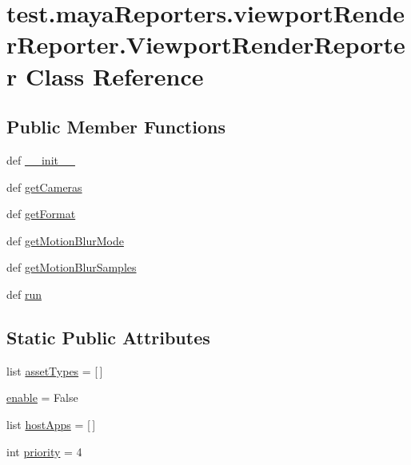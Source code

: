 \hypertarget{classtest_1_1mayaReporters_1_1viewportRenderReporter_1_1ViewportRenderReporter}{\section{test.\-maya\-Reporters.\-viewport\-Render\-Reporter.\-Viewport\-Render\-Reporter \-Class \-Reference}
\label{dd/d73/classtest_1_1mayaReporters_1_1viewportRenderReporter_1_1ViewportRenderReporter}
}
\subsection*{\-Public \-Member \-Functions}
\begin{DoxyCompactItemize}
\item 
def \hyperlink{classtest_1_1mayaReporters_1_1viewportRenderReporter_1_1ViewportRenderReporter_a0e86af8b3c2b1cc188761aa8ea526bb4}{\-\_\-\-\_\-init\-\_\-\-\_\-}
\item 
def \hyperlink{classtest_1_1mayaReporters_1_1viewportRenderReporter_1_1ViewportRenderReporter_a5aedf9a114103ffe4de36abe783adcc7}{get\-Cameras}
\item 
def \hyperlink{classtest_1_1mayaReporters_1_1viewportRenderReporter_1_1ViewportRenderReporter_ad32a6bf76fd58215ac41ae5f7e0292e7}{get\-Format}
\item 
def \hyperlink{classtest_1_1mayaReporters_1_1viewportRenderReporter_1_1ViewportRenderReporter_a9a73ecf33d3d3562ac32fcc5ba8f82bc}{get\-Motion\-Blur\-Mode}
\item 
def \hyperlink{classtest_1_1mayaReporters_1_1viewportRenderReporter_1_1ViewportRenderReporter_a028c4fa665065dede5cac530936774b4}{get\-Motion\-Blur\-Samples}
\item 
def \hyperlink{classtest_1_1mayaReporters_1_1viewportRenderReporter_1_1ViewportRenderReporter_ae6add4ecf5f901f3ab5f7d5b7ca9acbb}{run}
\end{DoxyCompactItemize}
\subsection*{\-Static \-Public \-Attributes}
\begin{DoxyCompactItemize}
\item 
list \hyperlink{classtest_1_1mayaReporters_1_1viewportRenderReporter_1_1ViewportRenderReporter_a17c9f5a74385a84b6df82060270565f9}{asset\-Types} = \mbox{[}$\,$\mbox{]}
\item 
\hyperlink{classtest_1_1mayaReporters_1_1viewportRenderReporter_1_1ViewportRenderReporter_afbf8a8ed753ac8b873e45b3abe1c98c0}{enable} = \-False
\item 
list \hyperlink{classtest_1_1mayaReporters_1_1viewportRenderReporter_1_1ViewportRenderReporter_a7c0e7f44755d838bef3e81259eac7710}{host\-Apps} = \mbox{[}$\,$\mbox{]}
\item 
int \hyperlink{classtest_1_1mayaReporters_1_1viewportRenderReporter_1_1ViewportRenderReporter_a049e080fbf3fff48f430ed7e3c70878e}{priority} = 4
\end{DoxyCompactItemize}


